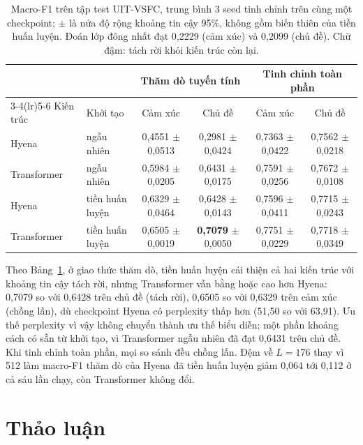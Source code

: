 \documentclass[11pt]{article}
\begin{document}
\begin{table}[t]
\centering
\footnotesize
\setlength{\tabcolsep}{3pt}
\begin{tabular}{llcccc}
\toprule
& & \multicolumn{2}{c}{Thăm dò tuyến tính} & \multicolumn{2}{c}{Tinh chỉnh toàn phần} \\
\cmidrule(lr){3-4}\cmidrule(lr){5-6}
Kiến trúc & Khởi tạo & Cảm xúc & Chủ đề & Cảm xúc & Chủ đề \\
\midrule
Hyena       & ngẫu nhiên      & 0,4551 $\pm$ 0,0513 & 0,2981 $\pm$ 0,0424 & 0,7363 $\pm$ 0,0422 & 0,7562 $\pm$ 0,0218 \\
Transformer & ngẫu nhiên      & 0,5984 $\pm$ 0,0205 & 0,6431 $\pm$ 0,0175 & 0,7591 $\pm$ 0,0256 & 0,7672 $\pm$ 0,0108 \\
Hyena       & tiền huấn luyện & 0,6329 $\pm$ 0,0464 & 0,6428 $\pm$ 0,0143 & 0,7596 $\pm$ 0,0411 & 0,7715 $\pm$ 0,0243 \\
Transformer & tiền huấn luyện & 0,6505 $\pm$ 0,0019 & \textbf{0,7079} $\pm$ 0,0050 & 0,7751 $\pm$ 0,0229 & 0,7718 $\pm$ 0,0349 \\
\bottomrule
\end{tabular}
\caption{Macro-F1 trên tập test UIT-VSFC, trung bình 3 seed tinh chỉnh trên cùng
một checkpoint; $\pm$ là nửa độ rộng khoảng tin cậy 95\%, không gồm biến thiên
của tiền huấn luyện. Đoán lớp đông nhất đạt 0,2229 (cảm xúc) và 0,2099
(chủ đề). Chữ đậm: tách rời khỏi kiến trúc còn lại.}
\label{tab:e7}
\end{table}

Theo Bảng~\ref{tab:e7}, ở giao thức thăm dò, tiền huấn luyện cải thiện cả hai
kiến trúc với khoảng tin cậy tách rời, nhưng Transformer vẫn bằng hoặc cao hơn
Hyena: 0,7079 so với 0,6428 trên chủ đề (tách rời), 0,6505 so với 0,6329 trên
cảm xúc (chồng lấn), dù checkpoint Hyena có perplexity thấp hơn (51,50 so với 63,91). Ưu
thế perplexity vì vậy không chuyển thành ưu thế biểu diễn; một phần khoảng cách
có sẵn từ khởi tạo, vì Transformer ngẫu nhiên đã đạt 0,6431 trên chủ đề. Khi
tinh chỉnh toàn phần, mọi so sánh đều chồng lấn. Đệm về $L = 176$ thay vì 512
làm macro-F1 thăm dò của Hyena đã tiền huấn luyện giảm 0,064 tới 0,112 ở cả sáu
lần chạy, còn Transformer không đổi.

\section{Thảo luận}
\end{document}
